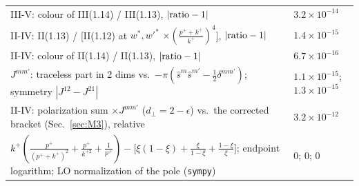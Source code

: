 \documentclass[10pt]{article}
\numberwithin{equation}{section}
\begin{document}
\begin{center}
\begin{longtable}{@{}p{}p{}@{}}
III-V: colour of III(1.14) / III(1.13), $|{\rm ratio}-1|$ & $3.2\times10^{-14}$\\
II-IV: II(1.13) / [II(1.12) at $w^*,w'^*$ $\times(\frac{p^++k^+}{k^+})^4$], $|{\rm ratio}-1|$ & $1.4\times10^{-15}$\\
II-IV: colour of II(1.14) / II(1.13), $|{\rm ratio}-1|$ & $6.7\times10^{-16}$\\
$J^{mm'}$: traceless part in 2 dims vs.\ $-\pi(\hat s^m\hat s^{m'}-\frac12\delta^{mm'})$; symmetry $|J^{12}-J^{21}|$ & $1.1\times10^{-15}$; $1.3\times10^{-15}$\\
II-IV: polarization sum $\times J^{mm'}$ ($d_\perp=2-\epsilon$) vs.\ the corrected bracket (Sec.~\ref{sec:M3}), relative & $3.2\times10^{-12}$\\
$k^+(\frac{p^+}{(p^++k^+)^2}+\frac{p^+}{k^{+2}}+\frac1{p^+})-\big[\xi(1-\xi)+\frac{\xi}{1-\xi}+\frac{1-\xi}{\xi}\big]$; endpoint logarithm; LO normalization of the pole (\texttt{sympy}) & 0; 0; 0\\
\bottomrule
\end{longtable}
\end{center}
\end{document}
